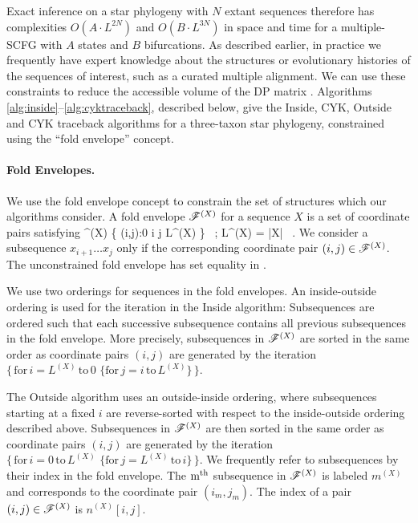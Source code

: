 \documentclass[10pt]{article}
\begin{document}
Exact inference on a star phylogeny with $N$ extant sequences therefore
has complexities $O(A \cdot L^{2N})$ and $O(B \cdot L^{3N})$ in space and
time for a multiple-SCFG with $A$ states and $B$ bifurcations. As
described earlier, in practice we frequently have expert knowledge
about the structures or evolutionary histories of the sequences of
interest, such as a curated multiple alignment.  We can use these
constraints to reduce the accessible volume of the DP matrix \cite{Holmes2005}.
Algorithms \ref{alg:inside}--\ref{alg:cyktraceback}, described below, give the Inside, CYK,
Outside and CYK traceback algorithms for a three-taxon star phylogeny,
constrained using the ``fold envelope'' concept.

\paragraph{Fold Envelopes.}
We use the fold envelope concept \cite{HolmesRubin2002a,Holmes2004}
to constrain the set of structures which our algorithms consider.
A fold envelope $\mathscr{F}^{(X)}$ for a sequence $X$ is a set of coordinate pairs satisfying
\beqn {}
\foldenv^{(X)} \subset \left\{ (i,j):0 \le i \le j \le L^{(X)} \right\} \, ;
\quad L^{(X)} = |X| \, .
\eeqn
We consider a subsequence $x_{i+1} \dots x_{j}$ only if the corresponding coordinate pair $(i,j) \in \mathscr{F}^{(X)}$.
The unconstrained fold envelope has set equality in .

We use two orderings for sequences in the fold envelopes.  An inside-outside ordering is used for the iteration 
in the Inside algorithm: Subsequences are ordered such that each successive subsequence 
contains all previous subsequences in the fold envelope.  More precisely, subsequences in $\mathscr{F}^{(X)}$ are sorted  
in the same order as coordinate pairs $(i,j)$ are generated by the
iteration $\{\,\mathrm{for}\, i = L^{(X)} \,\mathrm{to}\, 0 \,\,\{
\mathrm{for}\, j = i \,\mathrm{to}\, L^{(X)} \}\,\}$.


The Outside algorithm uses an outside-inside ordering, where subsequences starting at a fixed $i$ are reverse-sorted 
with respect to the inside-outside ordering described above.  Subsequences in $\mathscr{F}^{(X)}$ are then sorted 
in the same order as coordinate pairs $(i,j)$ are generated by the 
iteration $\{\,\mathrm{for}\, i = 0 \,\mathrm{to}\, L^{(X)} \,\,\{ \mathrm{for}\, j = L^{(X)}\, \mathrm{to}\, i \}\,\}$.
We frequently refer to subsequences by their index in the fold envelope.
The $\mathrm{m}^{\mathrm{th}}$ subsequence in $\mathscr{F}^{(X)}$ is labeled $m^{(X)}$ and corresponds to the coordinate pair $(i_{m}, j_{m})$.  The 
index of a pair $(i,j) \in \mathscr{F}^{(X)}$ is $n^{(X)}[i,j]$.
\end{document}
